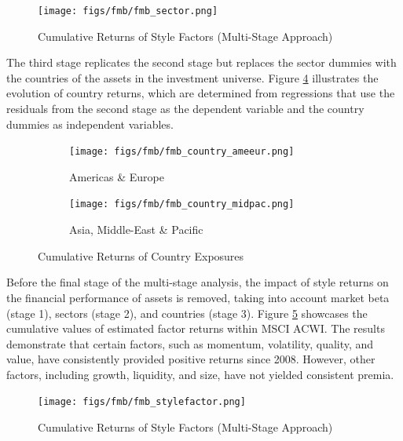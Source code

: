\documentclass[11pt,a4paper]{article}
\begin{document}
\clearpage

\begin{figure}[h!] 
    \centering
    \texttt{[image: figs/fmb/fmb\_sector.png]}
    \caption{Cumulative Returns of Style Factors (Multi-Stage Approach)}
    \label{fig:fmb_sector}
\end{figure}

The third stage replicates the second stage but replaces the sector dummies with the countries of the assets in the investment universe.
Figure \ref{fig:fmb_country} illustrates the evolution of country returns, which are determined from regressions that use the residuals from the second stage as the dependent variable and the country dummies as independent variables.

\begin{figure}[h!]
    \centering
    \begin{subfigure}{.5\textwidth}
        \centering
        \texttt{[image: figs/fmb/fmb\_country\_ameeur.png]}
        \caption{Americas \& Europe}
        \label{fig:fmb_country_ameeur}
    \end{subfigure}%
    \begin{subfigure}{.5\textwidth}
      \centering
      \texttt{[image: figs/fmb/fmb\_country\_midpac.png]}
      \caption{Asia, Middle-East \& Pacific}
      \label{fig:fmb_country_midpac}
    \end{subfigure}
    \caption{Cumulative Returns of Country Exposures}
    \label{fig:fmb_country}
\end{figure}

Before the final stage of the multi-stage analysis, the impact of style returns on the financial performance of assets is removed, taking into account market beta (stage 1), sectors (stage 2), and countries (stage 3).
Figure \ref{fig:fmb_factor} showcases the cumulative values of estimated factor returns within MSCI ACWI. 
The results demonstrate that certain factors, such as momentum, volatility, quality, and value, have consistently provided positive returns since 2008. However, other factors, including growth, liquidity, and size, have not yielded consistent premia.

\begin{figure}[h!] 
    \centering
    \texttt{[image: figs/fmb/fmb\_stylefactor.png]}
    \caption{Cumulative Returns of Style Factors (Multi-Stage Approach)}
    \label{fig:fmb_factor}
\end{figure}
\end{document}
